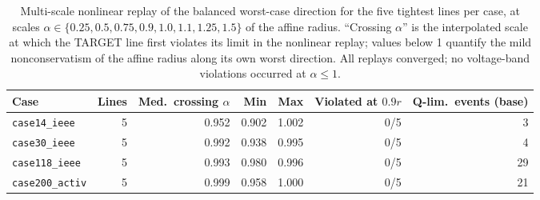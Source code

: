 \begin{table}[t]
\centering
\caption{Multi-scale nonlinear replay of the balanced worst-case direction
for the five tightest lines per case, at scales
$\alpha\in\{0.25,0.5,0.75,0.9,1.0,1.1,1.25,1.5\}$ of the affine radius.
``Crossing $\alpha$'' is the interpolated scale at which the TARGET line
first violates its limit in the nonlinear replay; values below 1 quantify
the mild nonconservatism of the affine radius along its own worst
direction.  All replays converged; no voltage-band violations occurred at
$\alpha \le 1$.\label{tab:replay}}
\footnotesize
\begin{tabularx}{\textwidth}{@{}Xrrrrrr@{}}
\toprule
Case & Lines & Med.\ crossing $\alpha$ & Min & Max & Violated at $0.9r$ & Q-lim.\ events (base) \\
\midrule
\texttt{case14\_ieee} & 5 & 0.952 & 0.902 & 1.002 & 0/5 & 3 \\
\texttt{case30\_ieee} & 5 & 0.992 & 0.938 & 0.995 & 0/5 & 4 \\
\texttt{case118\_ieee} & 5 & 0.993 & 0.980 & 0.996 & 0/5 & 29 \\
\texttt{case200\_activ} & 5 & 0.999 & 0.958 & 1.000 & 0/5 & 21 \\
\bottomrule
\end{tabularx}
\end{table}

